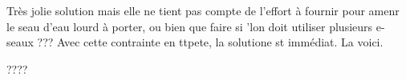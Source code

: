 \medskip


Très jolie solution mais elle ne tient pas compte de l'effort à fournir pour amenr le seau d'eau lourd à porter, ou bien que faire si 'lon doit utiliser plusieurs e-seaux ??? Avec cette contrainte en ttpete, la solutione st immédiat. La voici.

\smallskip
\begin{center}
\end{center}


\medskip


???? 
